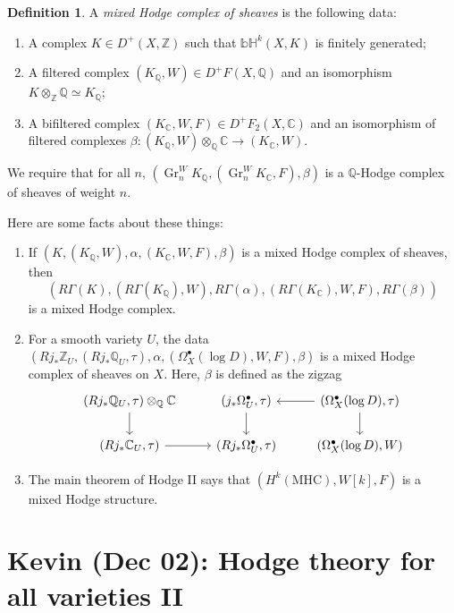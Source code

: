 \documentclass[leqno, openany]{memoir}
\theoremstyle{definition}
\newtheorem{defn}[thm]{Definition}
\theoremstyle{remark}
\theoremstyle{plain}
\theoremstyle{definition}
\theoremstyle{remark}
\newcommand{\bH}{\mathbb{bH}}
\newcommand{\C}{\mathbb{C}}
\newcommand{\Z}{\mathbb{Z}}
\newcommand{\Q}{\mathbb{Q}}
\newcommand{\on}[1]{\operatorname{#1}}
\begin{document}
\begin{defn}
    A \textit{mixed Hodge complex of sheaves} is the following data:
    \begin{enumerate}
        \item A complex $K \in D^+(X, \Z)$ such that $\bH^k(X, K)$ is finitely generated;
        \item A filtered complex $(K_{\Q}, W) \in D^+ F(X, \Q)$ and an isomorphism $K \otimes_{\Z} \Q \simeq K_{\Q}$;
        \item A bifiltered complex $(K_{\C}, W, F) \in D^+ F_2(X, \C)$ and an isomorphism of filtered complexes $\beta \colon (K_{\Q}, W) \otimes_{\Q} \C \to (K_{\C}, W)$.
    \end{enumerate}
    We require that for all $n$, $(\on{Gr}_n^W K_{\Q}, (\on{Gr}_n^W K_{\C}, F), \beta)$ is a $\Q$-Hodge complex of sheaves of weight $n$.
\end{defn}

Here are some facts about these things:
\begin{enumerate}
    \item If $(K, (K_{\Q}, W), \alpha, (K_{\C}, W, F), \beta)$ is a mixed Hodge complex of sheaves, then
        \[ (R \Gamma(K), (R \Gamma(K_{\Q}), W), R \Gamma(\alpha), (R\Gamma(K_{\C}), W, F), R \Gamma(\beta)) \]
        is a mixed Hodge complex.
    \item For a smooth variety $U$, the data $(R j_* \Z_U, (R j_* \Q_U, \tau), \alpha, (\Omega_X^{\bullet}(\log D), W, F), \beta)$ is a mixed Hodge complex of sheaves on $X$. Here, $\beta$ is defined as the zigzag
        \begin{equation*}
        \begin{tikzcd}
            (Rj_* \Q_U, \tau) \otimes_{\Q} \C \ar{d} & (j_* \Omega^{\bullet}_U, \tau) \ar{d} & (\Omega_X^{\bullet}(\log D), \tau) \ar{l} \ar{d} \\
            (R j_* \C_U, \tau) \ar{r} & (R j_* \Omega_U^{\bullet}, \tau)  & (\Omega_X^{\bullet}(\log D), W) 
        \end{tikzcd}
        \end{equation*}
    \item The main theorem of Hodge II says that $(H^k(\text{MHC}), W[k], F)$ is a mixed Hodge structure.
\end{enumerate}

\chapter{Kevin (Dec 02): Hodge theory for all varieties II}%
\label{cha:kevin_dec_02_hodge_theory_for_all_varieties_ii}
\end{document}
